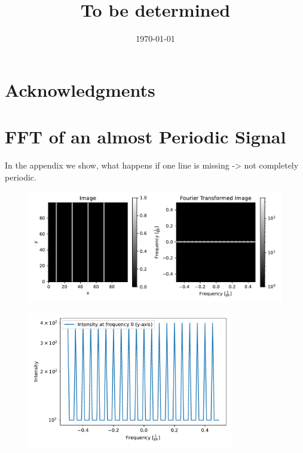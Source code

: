 \documentclass[a4paper,10pt,oneside, fleqn]{article}
\title{To be determined}
\date{\today}
\begin{document}
\maketitle

\pagestyle{fancy}               	%

\vspace*{\fill}
\begin{abstract}

\end{abstract}
\vspace*{\fill}
\newpage

\tableofcontents
\newpage








\section{Acknowledgments}


\newpage 

\appendix
\section{FFT of an almost Periodic Signal}
\label{almostPeriod} 
In the appendix we show, what happens if one line is missing -> not completely periodic.
\begin{figure}[H]
	\centering
		\includegraphics[width=1.0\textwidth]{pics/fft_simulationmorelines_almostper.pdf}
		\caption{}
		\label{fig:fft_beams_almostper}
\end{figure}
\begin{figure}[H]
	\centering
		\includegraphics[width=0.8\textwidth]{pics/fft_simulation_cutmorelines_almostper.pdf}
		\caption{}
		\label{fig:fft_beams_cut_almostper}
\end{figure}

\newpage


\end{document}
